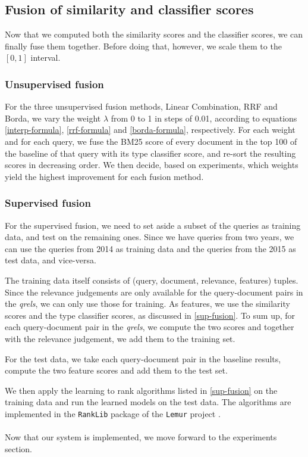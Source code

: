 \subsection{Fusion of similarity and classifier scores}
Now that we computed both the similarity scores and the classifier scores, we can finally fuse them together.
Before doing that, however, we scale them to the $[0,1]$ interval.

\subsubsection{Unsupervised fusion}\label{impl-unsup}
For the three unsupervised fusion methods, Linear Combination, RRF and Borda, we vary the weight $\lambda$ from 0 to 1 in steps of 0.01,
according to equations \ref{interp-formula}, \ref{rrf-formula} and \ref{borda-formula}, respectively. 
For each weight and for each query, we fuse the BM25
score of every document in the top 100 of the baseline of that query with its type classifier score, 
and re-sort the resulting scores in decreasing order.
We then decide, based on experiments, which weights yield the highest improvement for each fusion method.

\subsubsection{Supervised fusion}\label{impl-sup}
For the supervised fusion, we need to set aside a subset of the queries as training data, and test on the remaining ones.
Since we have queries from two years, we can use the queries from 2014 as training data and the queries from
the 2015 as test data, and vice-versa.

The training data itself consists of (query, document, relevance, features) tuples. Since the relevance judgements are only available
for the query-document pairs in the \emph{qrels}, we can only use those for training. As features, we use the 
similarity scores and the type classifier scores, as discussed in \ref{sup-fusion}. To sum up, for each
query-document pair in the \emph{qrels}, we compute the two scores and together with the relevance judgement, we add them
to the training set.

For the test data, we take each query-document pair in the baseline results, compute the two feature scores and add them
to the test set.

We then apply the learning to rank algorithms listed in \ref{sup-fusion} on the training data and run the learned models on the test data.
The algorithms are implemented in the \texttt{RankLib} package of the \texttt{Lemur} project \cite{ranklib}.
\\
\\
Now that our system is implemented, we move forward to the experiments section.




